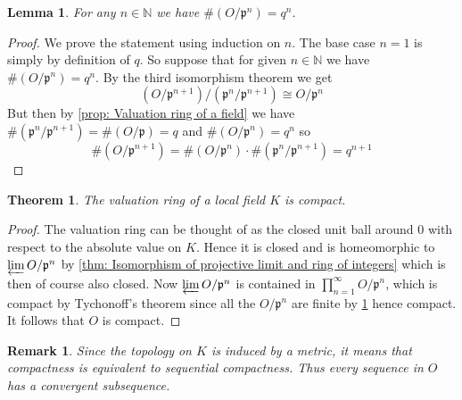 \documentclass{article}
\newtheorem{theorem}{Theorem}[section]
\newtheorem{lemma}{Lemma}[section]
\newtheorem{remark}{Remark}[section]
\newcommand{\mfrak}[1]{\mathfrak{#1}}
\newcommand{\mbb}[1]{\mathbb{#1}}
\numberwithin{equation}{section}
\begin{document}
\begin{lemma}\label{lem: Valuation ring mod power of prime is finite in local field}
	For any $n \in \mbb N$ we have $\# (O / \mfrak p^n) = q^n$.
\end{lemma}

\begin{proof}
	We prove the statement using induction on $n$. The base case $n = 1$ is simply by definition of $q$. So suppose that for given $n \in \mbb N$ we have $\# (O / \mfrak p^n) = q^n$. By the third isomorphism theorem we get
	$$(O / \mfrak p^{n+1}) / (\mfrak p^n / \mfrak p^{n+1}) \cong O / \mfrak p^{n}$$
	But then by \cref{prop: Valuation ring of a field} we have $\# (\mfrak p^n / \mfrak p^{n+1}) = \# (O /\mfrak p) = q$ and $\#(O / \mfrak p^{n}) = q^n$ so $$\# (O / \mfrak p^{n+1}) = \# (O / \mfrak p^{n}) \cdot \# (\mfrak p^n / \mfrak p^{n+1}) = q^{n+1}$$
\end{proof}






\begin{theorem} \label{thm: Valuation ring in local field is compact}
	The valuation ring of a local field $K$ is compact.
\end{theorem}
\begin{proof}
	The valuation ring can be thought of as the closed unit ball around 0 with respect to the absolute value on $K$. Hence it is closed and is homeomorphic to $\varprojlim O / \mfrak p^n$ by \cref{thm: Isomorphism of projective limit and ring of integers} which is then of course also closed. Now $\varprojlim O / \mfrak p^n$ is contained in $\prod_{n = 1}^\infty O / \mfrak p^n$, which is compact by Tychonoff's theorem since all the $O / \mfrak p^n$ are finite by \cref{lem: Valuation ring mod power of prime is finite in local field} hence compact. It follows that $O$ is compact.
\end{proof}
\begin{remark}\label{rem: Compactness is equivalent to sequential compactness}
	Since the topology on $K$ is induced by a metric, it means that compactness is equivalent to sequential compactness. Thus every sequence in $O$ has a convergent subsequence.
\end{remark}
\end{document}
